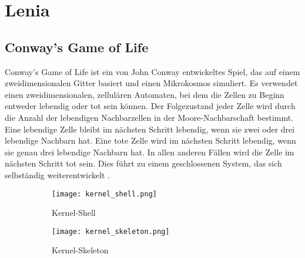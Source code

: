 \section{Lenia} \label{sec:lenia}

\subsection{Conway's Game of Life}
Conway's Game of Life ist ein von John Conway entwickeltes Spiel, das auf einem zweidimensionalen Gitter basiert und einen Mikrokosmos simuliert.
Es verwendet einen zweidimensionalen, zellulären Automaten, bei dem die Zellen zu Beginn entweder lebendig oder tot sein können.
Der Folgezustand jeder Zelle wird durch die Anzahl der lebendigen Nachbarzellen in der Moore-Nachbarschaft bestimmt.
Eine lebendige Zelle bleibt im nächsten Schritt lebendig, wenn sie zwei oder drei lebendige Nachbarn hat.
Eine tote Zelle wird im nächsten Schritt lebendig, wenn sie genau drei lebendige Nachbarn hat.
In allen anderen Fällen wird die Zelle im nächsten Schritt tot sein.
Dies führt zu einem geschlossenen System, das sich selbständig weiterentwickelt \cite{wikipedia_gol}.


\begin{figure}[!htbp]\centering
    \begin{subfigure}[t]{0.2\textwidth}
        \texttt{[image: kernel\_shell.png]}
        \caption{Kernel-Shell}
        \label{fig:kernels:shell}
    \end{subfigure}
    \hfill
    \begin{subfigure}[t]{0.2\textwidth}
        \centering
        \texttt{[image: kernel\_skeleton.png]}
        \caption{Kernel-Skeleton}
        \label{fig:kernels:skeleton}
    \end{subfigure}
    \caption{\cite{chan2018lenia}}
    \label{fig:kernels}
\end{figure}

